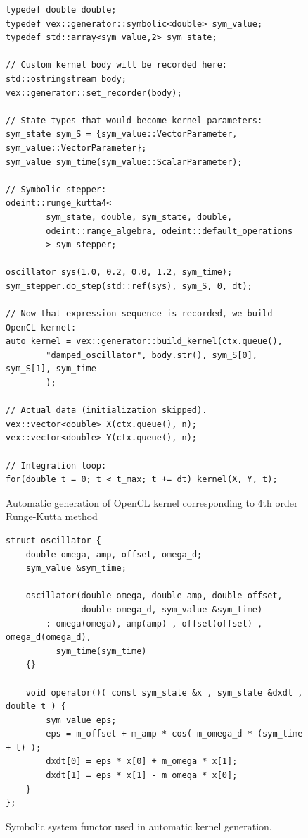\documentclass[1p]{elsarticle}
\begin{document}
\begin{figure}[p]
\begin{lstlisting}
typedef double double;
typedef vex::generator::symbolic<double> sym_value;
typedef std::array<sym_value,2> sym_state;

// Custom kernel body will be recorded here:
std::ostringstream body;
vex::generator::set_recorder(body);

// State types that would become kernel parameters:
sym_state sym_S = {sym_value::VectorParameter, sym_value::VectorParameter};
sym_value sym_time(sym_value::ScalarParameter);

// Symbolic stepper:
odeint::runge_kutta4<
        sym_state, double, sym_state, double,
        odeint::range_algebra, odeint::default_operations
        > sym_stepper;

oscillator sys(1.0, 0.2, 0.0, 1.2, sym_time);
sym_stepper.do_step(std::ref(sys), sym_S, 0, dt);

// Now that expression sequence is recorded, we build OpenCL kernel:
auto kernel = vex::generator::build_kernel(ctx.queue(),
        "damped_oscillator", body.str(), sym_S[0], sym_S[1], sym_time
        );

// Actual data (initialization skipped).
vex::vector<double> X(ctx.queue(), n);
vex::vector<double> Y(ctx.queue(), n);

// Integration loop:
for(double t = 0; t < t_max; t += dt) kernel(X, Y, t);
\end{lstlisting}
\caption{Automatic generation of OpenCL kernel corresponding to 4th order
Runge-Kutta method}
\label{code:krnbuilder}
\end{figure}

\begin{figure}[p]
\begin{lstlisting}
struct oscillator {
    double omega, amp, offset, omega_d;
    sym_value &sym_time;

    oscillator(double omega, double amp, double offset,
               double omega_d, sym_value &sym_time)
        : omega(omega), amp(amp) , offset(offset) , omega_d(omega_d),
          sym_time(sym_time)
    {}

    void operator()( const sym_state &x , sym_state &dxdt , double t ) {
        sym_value eps;
        eps = m_offset + m_amp * cos( m_omega_d * (sym_time + t) );
        dxdt[0] = eps * x[0] + m_omega * x[1];
        dxdt[1] = eps * x[1] - m_omega * x[0];
    }
};
\end{lstlisting}
\caption{Symbolic system functor used in automatic kernel generation.}
\label{code:symsysfunc}
\end{figure}
\end{document}
